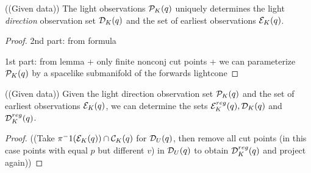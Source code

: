 \begin{proposition}
((Given data))
The light observations $\mathcal{P}_K(q)$ uniquely determines the light \emph{direction} observation set $\mathcal{D}_K(q)$ and the set of earliest observations $\mathcal{E}_K(q)$.
\end{proposition}
\begin{proof}
2nd part: from formula

1st part: from lemma + only finite nonconj cut points + we can parameterize $\mathcal{P}_K(q)$ by a spacelike submanifold of the forwards lightcone
\end{proof}

\begin{proposition}
((Given data))
Given the light direction observation set $\mathcal{P}_K(q)$ and the set of earliest observations $\mathcal{E}_K(q)$, we can determine the sets $\mathcal{E}^{reg}_K(q), \mathcal{D}_K(q)$ and $\mathcal{D}^{reg}_K(q)$.
\end{proposition}
\begin{proof}
((Take $\pi^-1(\mathcal{E}_K(q))\cap \mathcal{C}_K(q)$ for $\mathcal{D}_U(q)$, then remove all cut points (in this case points with equal $p$ but different $v$) in $\mathcal{D}_U(q)$ to obtain $\mathcal{D}^{reg}_K(q)$ and project again))
\end{proof}